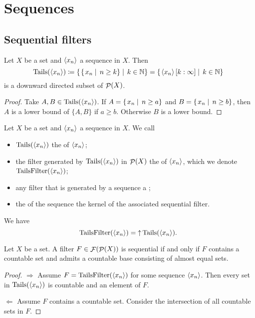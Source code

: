 \section{Sequences}
\subsection{Sequential filters}

\begin{lemma}
Let $X$ be a set and $\left\langle x_n \right\rangle$ a sequence in $X$. Then
\[ \operatorname{Tails}(\left\langle x_n \right\rangle) \coloneqq \left\{\left. \left\{\left. x_n \;\right|\; n \geq k \right\} \;\right|\; k\in \mathbb{N} \right\} = \left\{\left. \left\langle x_n \right\rangle[k:\infty] \;\right|\; k\in \mathbb{N} \right\} \]
is a downward directed subset of $\mathop{\mathcal{P}}(X)$.
\end{lemma}
\begin{proof}
Take $A,B\in \operatorname{Tails}(\left\langle x_n \right\rangle)$. If $A = \left\{\left. x_n \;\right|\; n \geq a \right\}$ and $B = \left\{\left. x_n \;\right|\; n \geq b \right\}$, then $A$ is a lower bound of $\{A,B\}$ if $a\geq b$. Otherwise $B$ is a lower bound.
\end{proof}

\begin{definition}
Let $X$ be a set and $\left\langle x_n \right\rangle$ a sequence in $X$. We call
\begin{itemize}
\item $\operatorname{Tails}(\left\langle x_n \right\rangle)$ the  of $\left\langle x_n \right\rangle$;
\item the filter generated by $\operatorname{Tails}(\left\langle x_n \right\rangle)$ in $\mathop{\mathcal{P}}(X)$ the  of $\left\langle x_n \right\rangle$, which we denote $\operatorname{TailsFilter}(\left\langle x_n \right\rangle)$;
\item any filter that is generated by a sequence a ;
\item the  of the sequence the kernel of the associated sequential filter.
\end{itemize}
We have 
\[ \operatorname{TailsFilter}(\left\langle x_n \right\rangle) = \mathop{\uparrow} \operatorname{Tails}(\left\langle x_n \right\rangle). \]
\end{definition}

\begin{proposition}
Let $X$ be a set. A filter $F\in \mathop{\mathcal{F}}(\mathop{\mathcal{P}}(X))$ is sequential \textup{if and only if} $F$ contains a countable set and admits a countable base consisting of almost equal sets.
\end{proposition}
\begin{proof}
$\Rightarrow$ Assume $F = \operatorname{TailsFilter}(\left\langle x_n \right\rangle)$ for some sequence $\left\langle x_n \right\rangle$. Then every set in $\operatorname{Tails}(\left\langle x_n \right\rangle)$ is countable and an element of $F$.

$\Leftarrow$ Assume $F$ contains a countable set. Consider the intersection of all countable sets in $F$.
\end{proof}

